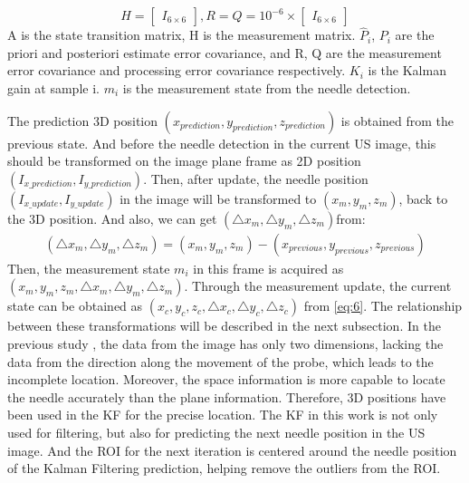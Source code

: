 \documentclass[journal,article,submit,moreauthors,pdftex]{Definitions/mdpi}
\begin{document}
\begin{equation}
H=
\begin{bmatrix}
I_{6\times6}
\end{bmatrix}
,R=Q=10^{-6}\times
\begin{bmatrix}
I_{6\times6}
\end{bmatrix}
\end{equation}
A is the state transition matrix, H is the measurement matrix. ${\hat{P}_i}$, ${P_i}$ are the priori and posteriori estimate error covariance, and R, Q are the measurement error covariance and processing error covariance respectively.
${K_i}$ is the Kalman gain at sample i.
${m_i}$ is the measurement state from the needle detection.

The prediction 3D position ${(x_{prediction},y_{prediction},z_{prediction})}$ is obtained from the previous state.
And before the needle detection in the current US image, this should be transformed on the image plane frame as 2D position ${(I_{x\_prediction},I_{y\_prediction})}$.
Then, after update, the needle position ${(I_{x\_update},I_{y\_update})}$ in the image will be transformed to ${(x_{m},y_{m},z_{m})}$, back to the 3D position.
And also, we can get ${(\triangle x_{m},\triangle y_{m},\triangle z_{m})}$from:
\begin{equation}\label{eq:15}
\begin{aligned}
(\triangle x_{m},\triangle y_{m},\triangle z_{m})=(x_{m},y_{m},z_{m})-(x_{previous},y_{previous},z_{previous})
\end{aligned}
\end{equation}
Then, the measurement state ${m_i}$ in this frame is acquired as${(x_{m},y_{m},z_{m},\triangle x_{m},\triangle y_{m},\triangle z_{m})}$.
Through the measurement update, the current state can be obtained as ${(x_{c},y_{c},z_{c},\triangle x_{c},\triangle y_{c},\triangle z_{c})}$ from \ref{eq:6}.
The relationship between these transformations will be described in the next subsection.
In the previous study \cite{Waine2016a}, the data from the image has only two dimensions, lacking the data from the direction along the movement of the probe, which leads to the incomplete location.
Moreover, the space information is more capable to locate the needle accurately than the plane information.
Therefore, 3D positions have been used in the KF for the precise location.
The KF in this work is not only used for filtering, but also for predicting the next needle position in the US image.
And the ROI for the next iteration is centered around the needle position of the Kalman Filtering prediction, helping remove the outliers from the ROI.
\end{document}
